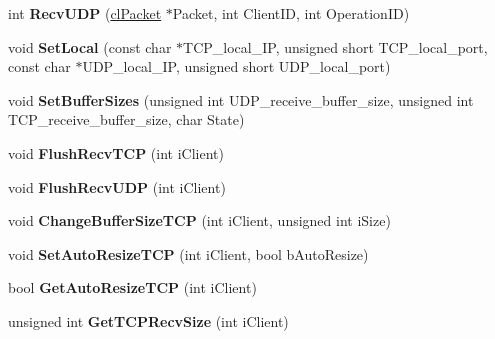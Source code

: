 \begin{DoxyCompactItemize}
\item 
\hypertarget{classcl_instance_a0ff09a588f7eef63546832f789f14cc8}{
int {\bfseries RecvUDP} (\hyperlink{classcl_packet}{clPacket} $\ast$Packet, int ClientID, int OperationID)}
\label{classcl_instance_a0ff09a588f7eef63546832f789f14cc8}

\item 
\hypertarget{classcl_instance_abc5f7e5ecde3470623e117a3d5e1e8c7}{
void {\bfseries SetLocal} (const char $\ast$TCP\_\-local\_\-IP, unsigned short TCP\_\-local\_\-port, const char $\ast$UDP\_\-local\_\-IP, unsigned short UDP\_\-local\_\-port)}
\label{classcl_instance_abc5f7e5ecde3470623e117a3d5e1e8c7}

\item 
\hypertarget{classcl_instance_ae5ea59580ac29d0fe0a51652be2980ee}{
void {\bfseries SetBufferSizes} (unsigned int UDP\_\-receive\_\-buffer\_\-size, unsigned int TCP\_\-receive\_\-buffer\_\-size, char State)}
\label{classcl_instance_ae5ea59580ac29d0fe0a51652be2980ee}

\item 
\hypertarget{classcl_instance_aaec031ba7dc1303fb19e495e712e3d49}{
void {\bfseries FlushRecvTCP} (int iClient)}
\label{classcl_instance_aaec031ba7dc1303fb19e495e712e3d49}

\item 
\hypertarget{classcl_instance_acf524e5af0541f1209f6f83c57e6cdbd}{
void {\bfseries FlushRecvUDP} (int iClient)}
\label{classcl_instance_acf524e5af0541f1209f6f83c57e6cdbd}

\item 
\hypertarget{classcl_instance_ad893d55f0d3bb7e2586b9d39ed3d1c6f}{
void {\bfseries ChangeBufferSizeTCP} (int iClient, unsigned int iSize)}
\label{classcl_instance_ad893d55f0d3bb7e2586b9d39ed3d1c6f}

\item 
\hypertarget{classcl_instance_a084e22f30f7a7219369e8191b9ce0725}{
void {\bfseries SetAutoResizeTCP} (int iClient, bool bAutoResize)}
\label{classcl_instance_a084e22f30f7a7219369e8191b9ce0725}

\item 
\hypertarget{classcl_instance_aa506c6584dc08c34fc651f1c508e30f2}{
bool {\bfseries GetAutoResizeTCP} (int iClient)}
\label{classcl_instance_aa506c6584dc08c34fc651f1c508e30f2}

\item 
\hypertarget{classcl_instance_a398265020ebe9a8b38c21c4e0e405822}{
unsigned int {\bfseries GetTCPRecvSize} (int iClient)}
\label{classcl_instance_a398265020ebe9a8b38c21c4e0e405822}


\end{DoxyCompactItemize}
